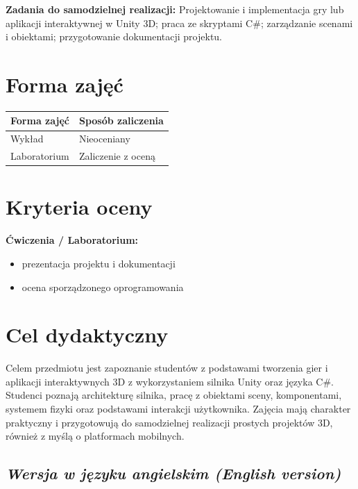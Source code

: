 \documentclass[12pt, a4paper]{article}
\newcommand{\thdrule}{\noalign{\global\setlength{\extrarowheight}{0pt}}}
\newcommand{\thdend}{\noalign{\global\setlength{\extrarowheight}{3pt}}}
\begin{document}
\vspace{4pt}
\noindent\textbf{Zadania do samodzielnej realizacji:} Projektowanie i implementacja gry lub aplikacji interaktywnej w Unity 3D; praca ze skryptami C\#; zarządzanie scenami i obiektami; przygotowanie dokumentacji projektu.

\section{Forma zajęć}

\begin{center}
{\scriptsize
\begin{tabular}{m{5cm}m{8cm}}
\thdrule\toprule
\rowcolor{pjatkRed} {\color{white}\textbf{Forma zajęć}} & {\color{white}\textbf{Sposób zaliczenia}} \\
\midrule\thdend
  \rowcolor{tableRowLight} Wykład & Nieoceniany \\
  \rowcolor{tableRowAlt} Laboratorium & Zaliczenie z oceną \\
\bottomrule
\end{tabular}}
\end{center}

\section{Kryteria oceny}

\textbf{Ćwiczenia / Laboratorium:}
\begin{itemize}
  \item prezentacja projektu i dokumentacji
  \item ocena sporządzonego oprogramowania
\end{itemize}


\section{Cel dydaktyczny}

Celem przedmiotu jest zapoznanie studentów z podstawami tworzenia gier i aplikacji interaktywnych 3D z wykorzystaniem silnika Unity oraz języka C\#. Studenci poznają architekturę silnika, pracę z obiektami sceny, komponentami, systemem fizyki oraz podstawami interakcji użytkownika. Zajęcia mają charakter praktyczny i przygotowują do samodzielnej realizacji prostych projektów 3D, również z myślą o platformach mobilnych.

\subsection*{\textit{Wersja w języku angielskim (English version)}}
\end{document}
